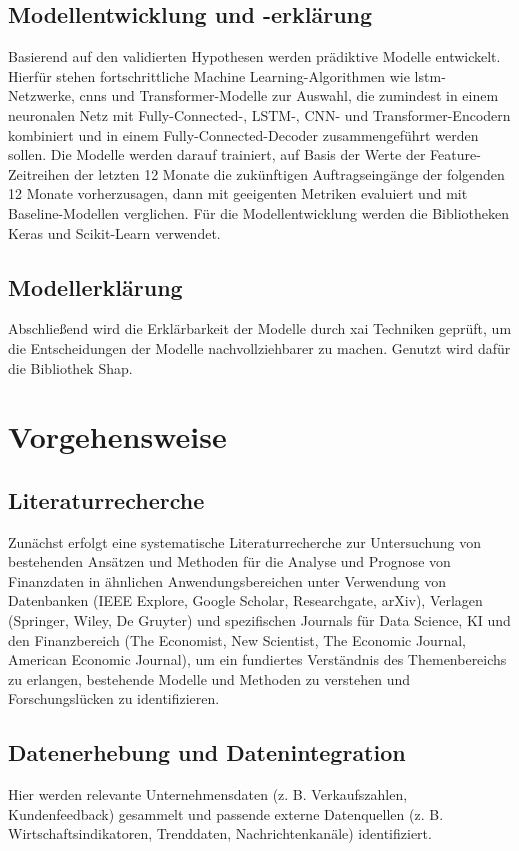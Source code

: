 \documentclass[lettersize,journal]{IEEEtran}
\begin{document}
\subsection{Modellentwicklung und -erklärung}
Basierend auf den validierten Hypothesen werden prädiktive Modelle entwickelt. Hierfür stehen fortschrittliche Machine Learning-Algorithmen wie \gls{lstm}-Netzwerke, \glspl{cnn} und Transformer-Modelle zur Auswahl, die zumindest in einem neuronalen Netz mit Fully-Connected-, LSTM-, CNN- und Transformer-Encodern kombiniert und in einem Fully-Connected-Decoder zusammengeführt werden sollen. Die Modelle werden darauf trainiert, auf Basis der Werte der Feature-Zeitreihen der letzten 12 Monate die zukünftigen Auftragseingänge der folgenden 12 Monate vorherzusagen, dann mit geeigenten Metriken evaluiert und mit Baseline-Modellen verglichen. Für die Modellentwicklung werden die Bibliotheken Keras und Scikit-Learn verwendet.

\subsection{Modellerklärung}
Abschließend wird die Erklärbarkeit der Modelle durch \gls{xai} Techniken geprüft, um die Entscheidungen der Modelle nachvollziehbarer zu machen. Genutzt wird dafür die Bibliothek Shap.

\section{Vorgehensweise}
\subsection*{Literaturrecherche} Zunächst erfolgt eine systematische Literaturrecherche zur Untersuchung von bestehenden Ansätzen und Methoden für die Analyse und Prognose von Finanzdaten in ähnlichen Anwendungsbereichen unter Verwendung von Datenbanken (IEEE Explore, Google Scholar, Researchgate, arXiv), Verlagen (Springer, Wiley, De Gruyter) und spezifischen Journals für Data Science, KI und den Finanzbereich (The Economist, New Scientist, The Economic Journal, American Economic Journal), um ein fundiertes Verständnis des Themenbereichs zu erlangen, bestehende Modelle und Methoden zu verstehen und Forschungslücken zu identifizieren.
\subsection*{Datenerhebung und Datenintegration} Hier werden relevante Unternehmensdaten (z. B. Verkaufszahlen, Kundenfeedback) gesammelt und passende externe Datenquellen (z. B. Wirtschaftsindikatoren, Trenddaten, Nachrichtenkanäle) identifiziert. 
\end{document}
